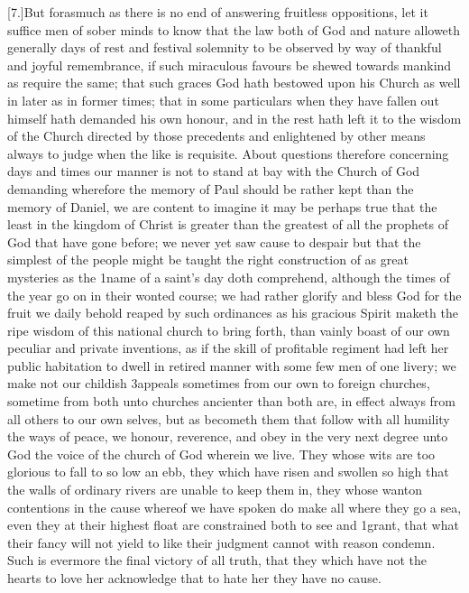 [7.]But forasmuch as there is no end of answering fruitless oppositions, let it suffice men of sober minds to know that the law both of God and nature alloweth generally days of rest  and festival solemnity to be observed by way of thankful and joyful remembrance,
 if such miraculous favours be shewed towards mankind as require the same; that such graces God hath bestowed upon his Church as well in later as in former times; that in some particulars when they have fallen out himself hath demanded his own honour, and in the rest hath left it to the wisdom of the Church directed by those precedents and enlightened by other means always to judge when the like is requisite. About questions therefore concerning days and times our manner is not to stand at bay with the Church of God demanding wherefore the memory of Paul should be rather kept than the memory of Daniel, we are content to imagine it may be perhaps true that the least in the kingdom of Christ is greater than the greatest of all the prophets of God that have gone before; we never yet saw cause to despair but that the simplest of the people might  be taught the right construction of as great mysteries as the 1name of a saint’s day doth comprehend, although the times of the year go on in their wonted course; we had rather glorify and bless God for the fruit we daily behold reaped by such ordinances as his gracious Spirit maketh the ripe wisdom of this national church to bring forth, than vainly boast of our own peculiar and private inventions, as if the skill of profitable regiment had left her public habitation to dwell in retired manner with some few men of one livery; we make not our childish 3appeals sometimes from our own to foreign  churches,
 sometime from both unto churches ancienter than both are, in effect always from all others to our own selves, but as becometh them that follow with all humility the ways of peace, we honour, reverence, and obey in the very next degree unto God the voice of the church of God wherein we live. They whose wits are too glorious to fall to so low an ebb, they which have risen and swollen so high that the walls of ordinary rivers are unable to keep them in, they whose wanton contentions in the cause whereof we have spoken do make all where they go a sea, even they at their highest float are constrained both to see and 1grant, that what their fancy will not yield to like their judgment cannot with reason condemn. Such is evermore the final victory of all truth, that they which have not the hearts to love her acknowledge that to hate her they have no cause.

